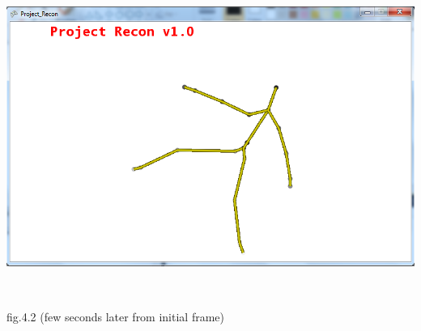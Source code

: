 \documentclass[11pt]{article} %
\begin{document}
\centerline{\includegraphics[scale=0.5]{skeleton_frame2.png}}
\\
\centerline{fig.4.2 (few seconds later from initial frame)}
\\
\end{document}
